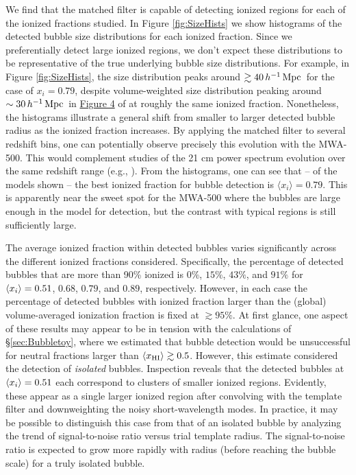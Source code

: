 We find that the matched filter is capable of detecting ionized
regions for each of the ionized fractions studied. In
Figure \ref{fig:SizeHists} we show histograms of the detected
bubble size distributions for each ionized fraction. Since
we preferentially detect large ionized regions, we don't
expect these distributions to be representative of the
true underlying bubble size distributions. For example, in Figure
\ref{fig:SizeHists}, the size distribution peaks around $\gtrsim40\,h^{-1}\,{\rm Mpc}\,$ for
the case of $x_i = 0.79$, despite volume-weighted size distribution peaking around $\sim 30\,h^{-1}\,{\rm Mpc}\,$ in
\href{http://iopscience.iop.org/0004-637X/654/1/12/fulltext/65071.fg4.html}{Figure
  4} of \cite{Zahn:2006sg} at roughly the same ionized fraction. Nonetheless,
the histograms illustrate a general shift from smaller to larger detected
bubble radius as the ionized fraction increases. By applying
the matched filter to several redshift bins, one can potentially
observe precisely this evolution with the MWA-500. This would
complement studies of the 21 cm power spectrum evolution over
the same redshift range (e.g., \citealt{Lidz:2007az}). From
the histograms, one can see that -- of the models shown -- the 
best ionized fraction
for bubble detection is $\langle x_i \rangle = 0.79$. This is apparently near the sweet spot for the MWA-500 where
the bubbles are large enough in the model for detection, but
the contrast with typical regions is still sufficiently large.

The average ionized fraction within detected bubbles varies
significantly across the different ionized fractions considered.
Specifically, the percentage of detected bubbles that are more than
90\% ionized is $0\%$, $15\%$, $43\%$, and $91\%$ for $\langle x_{i} \rangle = 0.51$,
$0.68$, $0.79$, and $0.89$, respectively.  However, in each case the
percentage of detected bubbles with ionized fraction larger than the
(global) volume-averaged ionization fraction is fixed at $\gtrsim 95\%$. At
first glance, one aspect of these results may appear to be in tension
with the calculations of \S\ref{sec:Bubbletoy}, where we estimated that
bubble detection would be unsuccessful for neutral fractions larger
than $\langle x_{\rm HI}\rangle \gtrsim 0.5$.  However, this estimate
considered the detection of {\em isolated} bubbles. Inspection reveals
that the detected bubbles at $\langle x_{i} \rangle = 0.51$ each correspond to clusters
of smaller ionized regions. Evidently, these appear as a single larger ionized
region after convolving with the template filter and downweighting
the noisy short-wavelength modes. In practice, it may be possible to distinguish
this case from that of an isolated bubble by analyzing the trend of 
signal-to-noise ratio versus trial template radius. The signal-to-noise
ratio is expected to grow more rapidly with radius (before reaching the bubble
scale) for a truly isolated
bubble.


